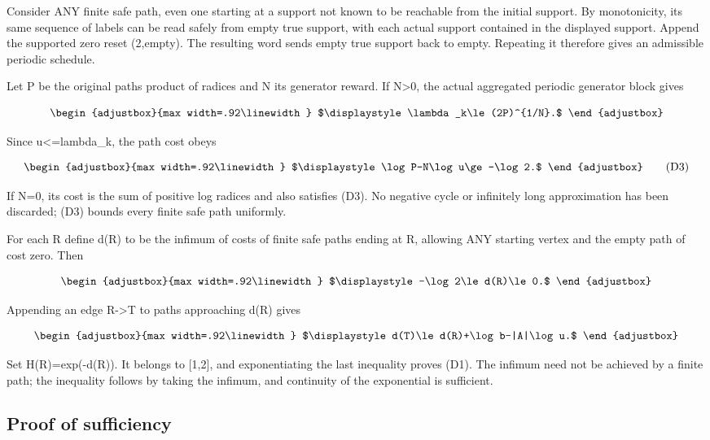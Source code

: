 Consider ANY finite safe path, even one starting at a support not known to be reachable from the initial support. By monotonicity, its same sequence of labels can be read safely from empty true support, with each actual support contained in the displayed support. Append the supported zero reset (2,empty). The resulting word sends empty true support back to empty. Repeating it therefore gives an admissible periodic schedule.

Let P be the original path\textquotesingle s product of radices and N its generator reward. If N\textgreater0, the actual aggregated periodic generator block gives

\[
\begin{adjustbox}{max width=.92\linewidth}
$\displaystyle \lambda_k\le(2P)^{1/N}.$
\end{adjustbox}
\]

Since u\textless=lambda\_k, the path cost obeys

\[
\begin{adjustbox}{max width=.92\linewidth}
$\displaystyle \log P-N\log u\ge-\log2.$
\end{adjustbox}
\tag{D3}
\]

If N=0, its cost is the sum of positive log radices and also satisfies (D3). No negative cycle or infinitely long approximation has been discarded; (D3) bounds every finite safe path uniformly.

For each R define d(R) to be the infimum of costs of finite safe paths ending at R, allowing ANY starting vertex and the empty path of cost zero. Then

\[
\begin{adjustbox}{max width=.92\linewidth}
$\displaystyle -\log2\le d(R)\le0.$
\end{adjustbox}
\]

Appending an edge R-\textgreater T to paths approaching d(R) gives

\[
\begin{adjustbox}{max width=.92\linewidth}
$\displaystyle d(T)\le d(R)+\log b-|A|\log u.$
\end{adjustbox}
\]

Set H(R)=exp(-d(R)). It belongs to {[}1,2{]}, and exponentiating the last inequality proves (D1). The infimum need not be achieved by a finite path; the inequality follows by taking the infimum, and continuity of the exponential is sufficient.

\subsection{Proof of sufficiency}\label{n05-proof-of-sufficiency}

